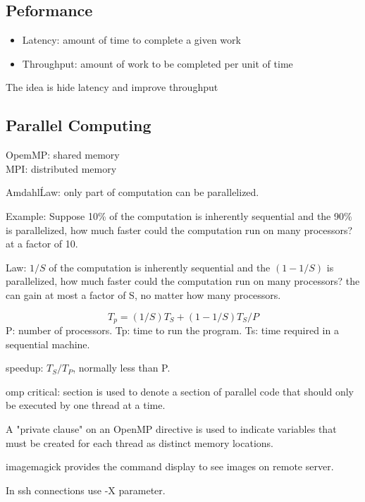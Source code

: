 \subsection{Peformance}
\begin{itemize}
  \item Latency: amount of time to complete a given work
  \item Throughput: amount of work to be completed per unit of time
\end{itemize}

The idea is hide latency and improve throughput

\subsection{Parallel Computing}
OpemMP: shared memory \\
MPI: distributed memory 

Amdahl\' Law: only part of computation can be parallelized.

Example: Suppose 10\% of the computation is inherently sequential and the 90\% is parallelized, how much faster could the computation run on many processors? at a factor of 10.

Law: $1/S$ of the computation is inherently sequential and the $(1-1/S)$ is parallelized, how much faster could the computation run on many processors? the can gain at most a factor of S, no matter how many processors.

\begin{equation}
T_p = (1/S)T_S + (1-1/S)T_S/P 
\end{equation}
P: number of processors. Tp: time to run the program. Ts: time required in a sequential machine.

speedup: $T_S/T_P$, normally less than P.

omp critical: section is used to denote a section of parallel code that should only be executed by one thread at a time. 

A "private clause" on an OpenMP directive is used to indicate variables that must be created for each thread as distinct memory locations.

imagemagick provides the command display to see images on remote server. 

In ssh connections use -X parameter.

